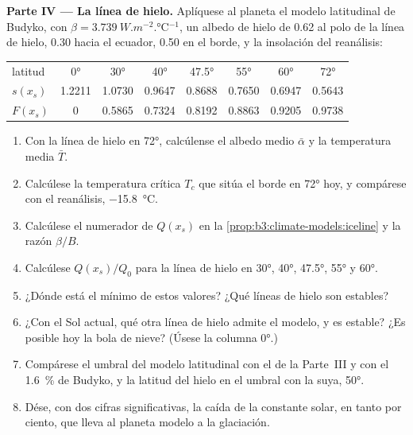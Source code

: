 \begin{problem}
\medskip\noindent\textbf{Parte IV --- La línea de hielo.} Aplíquese al planeta
el modelo latitudinal de Budyko, con $\beta = \qty{3.739}{W.m^{-2}.\celsius^{-1}}$,
un albedo de hielo de 0.62 al polo de la línea de hielo, 0.30 hacia el ecuador, 0.50 en
el borde, y la insolación del reanálisis:
\begin{center}
\begin{tabular}{lccccccc}
\hline
latitud & \ang{0} & \ang{30} & \ang{40} & \ang{47.5} & \ang{55} & \ang{60} & \ang{72}\\
$s(x_s)$ & 1.2211 & 1.0730 & 0.9647 & 0.8688 & 0.7650 & 0.6947 & 0.5643\\
$F(x_s)$ & 0 & 0.5865 & 0.7324 & 0.8192 & 0.8863 & 0.9205 & 0.9738\\
\hline
\end{tabular}
\end{center}
\begin{enumerate}[resume]
\item Con la línea de hielo en \ang{72}, calcúlense el albedo medio $\bar\alpha$
  y la temperatura media $\bar T$.
\item Calcúlese la temperatura crítica $T_c$ que sitúa el borde en
  \ang{72} hoy, y compárese con el reanálisis, \qty{-15.8}{\celsius}.
\item Calcúlese el numerador de $Q(x_s)$ en la \cref{prop:b3:climate-models:iceline}
  y la razón $\beta/B$.
\item Calcúlese $Q(x_s)/Q_0$ para la línea de hielo en \ang{30}, \ang{40},
  \ang{47.5}, \ang{55} y \ang{60}.
\item ¿Dónde está el mínimo de estos valores? ¿Qué líneas de hielo son estables?
\item ¿Con el Sol actual, qué otra línea de hielo admite el modelo, y es
  estable? ¿Es posible hoy la bola de nieve? (Úsese la columna \ang{0}.)
\item Compárese el umbral del modelo latitudinal con el de la Parte~III
  y con el \qty{1.6}{\percent} de Budyko, y la latitud del hielo en el
  umbral con la suya, \ang{50}.
\item Dése, con dos cifras significativas, la caída de la constante solar, en
  tanto por ciento, que lleva al planeta modelo a la glaciación.
\end{enumerate}
\end{problem}
